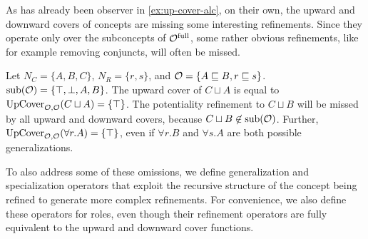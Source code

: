 As has already been observer in \cref{ex:up-cover-alc}, on their own, the upward and downward covers of concepts are missing some interesting refinements. Since they operate only over the subconcepts of ${\mathcal{O}^\textnormal{full}}$, some rather obvious refinements, like for example removing conjuncts, will often be missed.
\begin{example} \label{exa:up-cover}
  Let $N_C = \{A, B, C\}$, $N_R = \{ r, s \}$, and $\mathcal{O} = \{A \sqsubseteq B, r \sqsubseteq s\}$. ${\operatorname{sub}}(\mathcal{O}) = \{\top, \bot, A, B\}$. The upward cover of $C \sqcup A$ is equal to ${\operatorname{UpCover}}_{\mathcal{O},\mathcal{O}}(C \sqcup A) = \{ \top \}$. The potentiality refinement to $C \sqcup B$ will be missed by all upward and downward covers, because $C \sqcup B \not\in {\ensuremath{\operatorname{sub}}}(\mathcal{O})$. Further, ${\operatorname{UpCover}}_{\mathcal{O},\mathcal{O}}(\forall r.A) = \{ \top \}$, even if $\forall r.B$ and $\forall s.A$ are both possible generalizations.
\end{example}

To also address some of these omissions, we define generalization and specialization operators that exploit the recursive structure of the concept being refined to generate more complex refinements. For convenience, we also define these operators for roles, even though their refinement operators are fully equivalent to the upward and downward cover functions.

